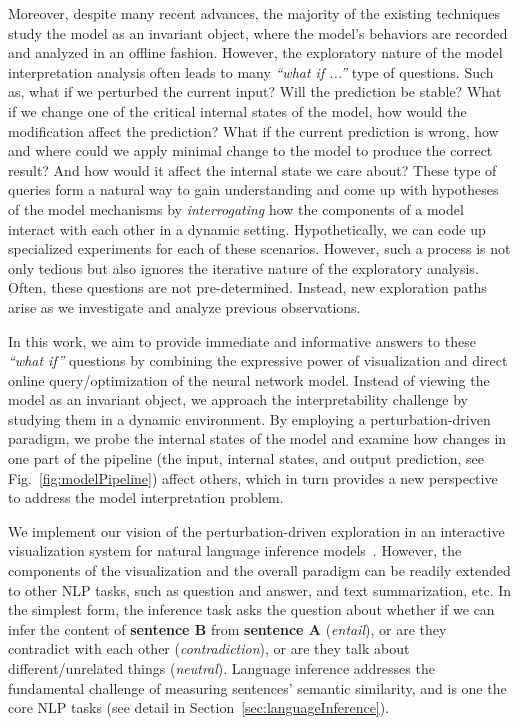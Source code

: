 Moreover, despite many recent advances, the majority of the existing techniques study the model as an invariant object, where the model's behaviors are recorded and analyzed in an offline fashion.
%
However, the exploratory nature of the model interpretation analysis often leads to many \emph{``what if ...''} type of questions. Such as, what if we perturbed the current input? Will the prediction be stable? What if we change one of the critical internal states of the model, how would the modification affect the prediction? What if the current prediction is wrong, how and where could we apply minimal change to the model to produce the correct result? And how would it affect the internal state we care about? These type of queries form a natural way to gain understanding and come up with hypotheses of the model mechanisms by \emph{interrogating} how the components of a model interact with each other in a dynamic setting. Hypothetically, we can code up specialized experiments for each of these scenarios. However, such a process is not only tedious but also ignores the iterative nature of the exploratory analysis. Often, these questions are not pre-determined. Instead, new exploration paths arise as we investigate and analyze previous observations.

In this work, we aim to provide immediate and informative answers to these \emph{``what if''} questions by combining the expressive power of visualization and direct online query/optimization of the neural network model. Instead of viewing the model as an invariant object, we approach the interpretability challenge by studying them in a dynamic environment. By employing a perturbation-driven paradigm, we probe the internal states of the model and examine how changes in one part of the pipeline (the input, internal states, and output prediction, see Fig.~\ref{fig:modelPipeline}) affect others, which in turn provides a new perspective to address the model interpretation problem.

We implement our vision of the perturbation-driven exploration in an interactive visualization system for natural language inference models~\cite{Parikh2016}.
However, the components of the visualization and the overall paradigm can be readily extended to other NLP tasks, such as question and answer, and text summarization, etc.
%
In the simplest form, the inference task asks the question about whether if we can infer the content of \textbf{sentence B} from \textbf{sentence A} (\emph{entail}), or are they contradict with each other (\emph{contradiction}), or are they talk about different/unrelated things (\emph{neutral}). Language inference addresses the fundamental challenge of measuring sentences' semantic similarity, and is one the core NLP tasks (see detail in Section~\ref{sec:languageInference}).

